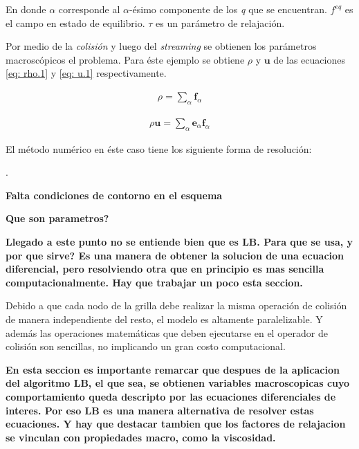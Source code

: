 En donde $\alpha$ corresponde al  $\alpha$-ésimo componente de los \textit{q} que se encuentran. $f^{eq}$ es el campo en estado de equilibrio. $\tau$ es un parámetro de relajación. 

Por medio de la \textit{colisión} y luego del \textit{streaming} se obtienen los parámetros macroscópicos el problema. Para éste ejemplo se obtiene $\rho$ y $\mathbf{u}$ de las ecuaciones \ref{eq: rho.1} y \ref{eq: u.1} respectivamente.

\begin{align}
	\rho = \sum_{\alpha} \mathbf{f}_{\alpha}
	\label{eq: rho.1}
\end{align}

\begin{align}
	\rho \mathbf{u}= \sum_{\alpha} \mathbf{e}_{\alpha} \mathbf{f}_{\alpha}
	\label{eq: u.1}
\end{align}

El método numérico en éste caso tiene los siguiente forma de resolución:
\newline
{\scriptsize

}
.
\newline 
\newline 

\textbf{Falta condiciones de contorno en el esquema}


\textbf{Que son parametros?}

\textbf{Llegado a este punto no se entiende bien que es LB. Para que se usa, y por que sirve? Es una manera de obtener la solucion de una ecuacion diferencial, pero resolviendo otra que en principio es mas sencilla computacionalmente. Hay que trabajar un poco esta seccion.}

Debido a que cada nodo de la grilla debe realizar la misma operación de colisión de manera independiente del resto, el modelo es altamente paralelizable. Y además las operaciones matemáticas que deben ejecutarse en el operador de colisión son sencillas, no implicando un gran costo computacional.

\textbf{En esta seccion es importante remarcar que despues de la aplicacion del algoritmo LB, el que sea, se obtienen variables macroscopicas cuyo comportamiento queda descripto por las ecuaciones diferenciales de interes. Por eso LB es una manera alternativa de resolver estas ecuaciones. Y hay que destacar tambien que los factores de relajacion se vinculan con propiedades macro, como la viscosidad.}

